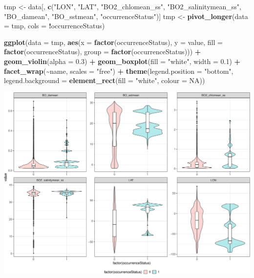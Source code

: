 \documentclass[
]{book}
\newenvironment{Shaded}{\begin{snugshade}}{\end{snugshade}}
\newcommand{\AttributeTok}[1]{\textcolor[rgb]{0.13,0.29,0.53}{#1}}
\newcommand{\ConstantTok}[1]{\textcolor[rgb]{0.56,0.35,0.01}{#1}}
\newcommand{\FloatTok}[1]{\textcolor[rgb]{0.00,0.00,0.81}{#1}}
\newcommand{\FunctionTok}[1]{\textcolor[rgb]{0.13,0.29,0.53}{\textbf{#1}}}
\newcommand{\NormalTok}[1]{#1}
\newcommand{\OtherTok}[1]{\textcolor[rgb]{0.56,0.35,0.01}{#1}}
\newcommand{\SpecialCharTok}[1]{\textcolor[rgb]{0.81,0.36,0.00}{\textbf{#1}}}
\newcommand{\StringTok}[1]{\textcolor[rgb]{0.31,0.60,0.02}{#1}}
\begin{document}
\begin{Shaded}
\begin{Highlighting}[]
\NormalTok{tmp }\OtherTok{\textless{}{-}}\NormalTok{ data[, }\FunctionTok{c}\NormalTok{(}\StringTok{"LON"}\NormalTok{, }\StringTok{"LAT"}\NormalTok{, }\StringTok{"BO2\_chlomean\_ss"}\NormalTok{,}
    \StringTok{"BO2\_salinitymean\_ss"}\NormalTok{, }\StringTok{"BO\_damean"}\NormalTok{, }\StringTok{"BO\_sstmean"}\NormalTok{,}
    \StringTok{"occurrenceStatus"}\NormalTok{)]}
\NormalTok{tmp }\OtherTok{\textless{}{-}} \FunctionTok{pivot\_longer}\NormalTok{(}\AttributeTok{data =}\NormalTok{ tmp, }\AttributeTok{cols =} \SpecialCharTok{!}\NormalTok{occurrenceStatus)}

\FunctionTok{ggplot}\NormalTok{(}\AttributeTok{data =}\NormalTok{ tmp, }\FunctionTok{aes}\NormalTok{(}\AttributeTok{x =} \FunctionTok{factor}\NormalTok{(occurrenceStatus),}
    \AttributeTok{y =}\NormalTok{ value, }\AttributeTok{fill =} \FunctionTok{factor}\NormalTok{(occurrenceStatus),}
    \AttributeTok{group =} \FunctionTok{factor}\NormalTok{(occurrenceStatus))) }\SpecialCharTok{+}
    \FunctionTok{geom\_violin}\NormalTok{(}\AttributeTok{alpha =} \FloatTok{0.3}\NormalTok{) }\SpecialCharTok{+} \FunctionTok{geom\_boxplot}\NormalTok{(}\AttributeTok{fill =} \StringTok{"white"}\NormalTok{,}
    \AttributeTok{width =} \FloatTok{0.1}\NormalTok{) }\SpecialCharTok{+} \FunctionTok{facet\_wrap}\NormalTok{(}\SpecialCharTok{\textasciitilde{}}\NormalTok{name, }\AttributeTok{scales =} \StringTok{"free"}\NormalTok{) }\SpecialCharTok{+}
    \FunctionTok{theme}\NormalTok{(}\AttributeTok{legend.position =} \StringTok{"bottom"}\NormalTok{, }\AttributeTok{legend.background =} \FunctionTok{element\_rect}\NormalTok{(}\AttributeTok{fill =} \StringTok{"white"}\NormalTok{,}
        \AttributeTok{colour =} \ConstantTok{NA}\NormalTok{))}
\end{Highlighting}
\end{Shaded}

\includegraphics{_main_files/figure-latex/unnamed-chunk-50-1.pdf}
\end{document}
